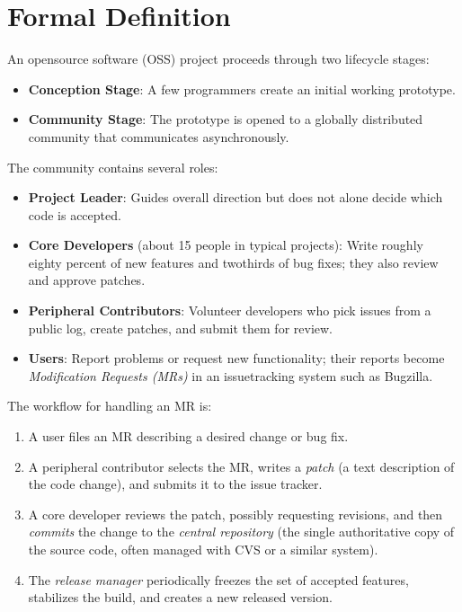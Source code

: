 \documentclass[12pt, a4paper]{article}
\begin{document}
\section{Formal Definition}
An opensource software (OSS) project proceeds through two lifecycle stages:

\begin{itemize}
  \item \textbf{Conception Stage}: A few programmers create an initial working prototype.
  \item \textbf{Community Stage}: The prototype is opened to a globally distributed community that communicates asynchronously.
\end{itemize}

The community contains several roles:

\begin{itemize}
  \item \textbf{Project Leader}: Guides overall direction but does not alone decide which code is accepted.
  \item \textbf{Core Developers} (about 15 people in typical projects): Write roughly eighty percent of new features and twothirds of bug fixes; they also review and approve patches.
  \item \textbf{Peripheral Contributors}: Volunteer developers who pick issues from a public log, create patches, and submit them for review.
  \item \textbf{Users}: Report problems or request new functionality; their reports become \emph{Modification Requests (MRs)} in an issuetracking system such as Bugzilla.
\end{itemize}

The workflow for handling an MR is:

\begin{enumerate}
  \item A user files an MR describing a desired change or bug fix.
  \item A peripheral contributor selects the MR, writes a \emph{patch} (a text description of the code change), and submits it to the issue tracker.
  \item A core developer reviews the patch, possibly requesting revisions, and then \emph{commits} the change to the \emph{central repository} (the single authoritative copy of the source code, often managed with CVS or a similar system).
  \item The \emph{release manager} periodically freezes the set of accepted features, stabilizes the build, and creates a new released version.
\end{enumerate}
\end{document}
